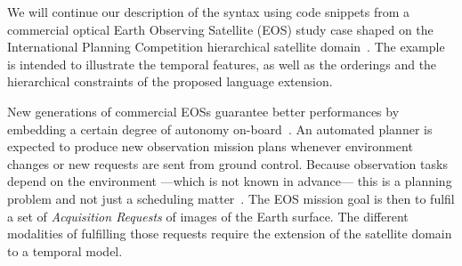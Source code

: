 \documentclass[letterpaper]{article} %
\begin{document}

We will continue our description of the syntax using code snippets from a commercial optical Earth Observing Satellite (EOS) study case shaped on the International Planning Competition hierarchical satellite domain~\citep{schattenberg2020}. The example is intended to illustrate the temporal features, as well as the orderings and the hierarchical constraints of the proposed language extension.

New generations of commercial EOSs guarantee better performances by embedding a certain degree of autonomy on-board~\citep{pralet2019}. An automated planner is expected to produce new observation mission plans whenever environment changes or new requests are sent from ground control. Because observation tasks depend on the environment ---which is not known in advance--- this is a planning problem and not just a scheduling matter~\citep{rodriguez-moreno2004}.
%
The EOS mission goal is then to fulfil a set of \emph{Acquisition Requests} of images of the Earth surface.
The different modalities of fulfilling those requests require the extension of the satellite domain to a temporal model.

%


\end{document}
